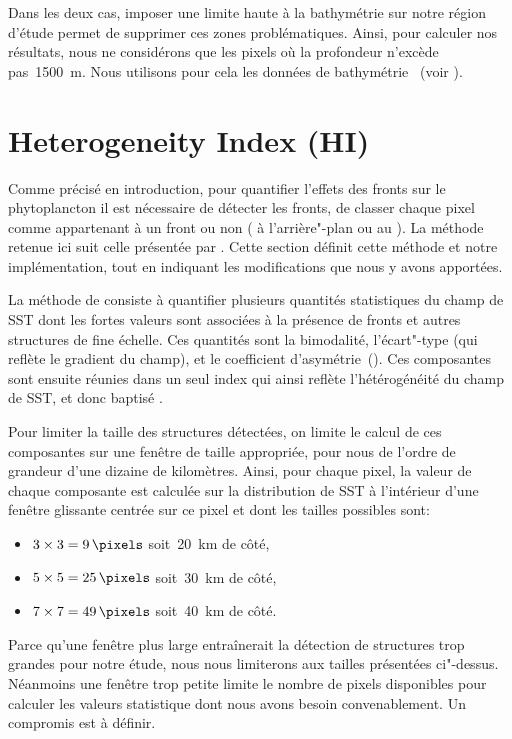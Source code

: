 Dans les deux cas, imposer une limite haute à la bathymétrie sur notre région d'étude permet de supprimer ces zones problématiques.
Ainsi, pour calculer nos résultats, nous ne considérons que les pixels où la profondeur n'excède pas~\qty{1500}{\m}.
Nous utilisons pour cela les données de bathymétrie ~(voir ).

\section{Heterogeneity Index (HI)}
\label{sec:HI}

Comme précisé en introduction, pour quantifier l'effets des fronts sur le phytoplancton il est nécessaire de détecter les fronts,  de classer chaque pixel comme appartenant à un front ou non ( à l'arrière"-plan ou au ).
La méthode retenue ici suit celle présentée par \textcite{liu_2016} .
Cette section définit cette méthode et notre implémentation, tout en indiquant les modifications que nous y avons apportées.

La méthode de \textcite{liu_2016} consiste à quantifier plusieurs quantités statistiques du champ de SST dont les fortes valeurs sont associées à la présence de fronts et autres structures de fine échelle.
Ces quantités sont la bimodalité, l'écart"-type (qui reflète le gradient du champ), et le coefficient d'asymétrie~().
Ces composantes sont ensuite réunies dans un seul index qui ainsi reflète l'hétérogénéité du champ de SST, et donc baptisé .

Pour limiter la taille des structures détectées, on limite le calcul de ces composantes sur une fenêtre de taille appropriée,  pour nous de l'ordre de grandeur d'une dizaine de kilomètres.
Ainsi, pour chaque pixel, la valeur de chaque composante est calculée sur la distribution de SST à l'intérieur d'une fenêtre glissante centrée sur ce pixel et dont les tailles possibles sont:
\begin{itemize}
  \item \(3 \times 3 =\qty{9}{\pixels}\) soit~\tapprox\qty{20}{\km} de côté,
  \item \(5 \times 5 =\qty{25}{\pixels}\) soit~\tapprox\qty{30}{\km} de côté,
  \item \(7 \times 7 =\qty{49}{\pixels}\) soit~\tapprox\qty{40}{\km} de côté.
\end{itemize}
Parce qu'une fenêtre plus large entraînerait la détection de structures trop grandes pour notre étude, nous nous limiterons aux tailles présentées ci"-dessus.
Néanmoins une fenêtre trop petite limite le nombre de pixels disponibles pour calculer les valeurs statistique dont nous avons besoin convenablement.
Un compromis est à définir.

